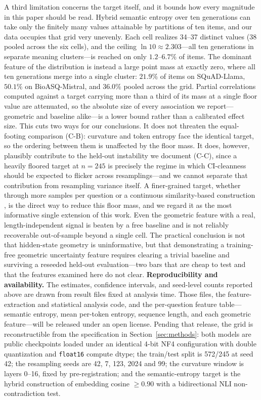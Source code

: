 \documentclass[11pt]{article}
\begin{document}
A third limitation concerns the target itself, and it bounds how every magnitude in this paper should be read. Hybrid semantic entropy over ten generations can take only the finitely many values attainable by partitions of ten items, and our data occupies that grid very unevenly. Each cell realizes 34--37 distinct values (38 pooled across the six cells), and the ceiling $\ln 10 \approx 2.303$---all ten generations in separate meaning clusters---is reached on only $1.2$--$6.7\%$ of items. The dominant feature of the distribution is instead a large point mass at exactly zero, where all ten generations merge into a single cluster: $21.9\%$ of items on SQuAD-Llama, $50.1\%$ on BioASQ-Mistral, and $36.0\%$ pooled across the grid. Partial correlations computed against a target carrying more than a third of its mass at a single floor value are attenuated, so the absolute size of every association we report---geometric and baseline alike---is a lower bound rather than a calibrated effect size. This cuts two ways for our conclusions. It does not threaten the equal-footing comparison (C-B): curvature and token entropy face the identical target, so the ordering between them is unaffected by the floor mass. It does, however, plausibly contribute to the held-out instability we document (C-C), since a heavily floored target at $n=245$ is precisely the regime in which CI-cleanness should be expected to flicker across resamplings---and we cannot separate that contribution from resampling variance itself. A finer-grained target, whether through more samples per question or a continuous similarity-based construction \citep{nguyen2025beyond,nikitin2024kernel}, is the direct way to reduce this floor mass, and we regard it as the most informative single extension of this work.
Even the geometric feature with a real, length-independent signal is beaten by a free baseline and is not reliably recoverable out-of-sample beyond a single cell. The practical conclusion is not that hidden-state geometry is uninformative, but that demonstrating a training-free geometric uncertainty feature requires clearing a trivial baseline and surviving a reseeded held-out evaluation---two bars that are cheap to test and that the features examined here do not clear.
\textbf{Reproducibility and availability.} The estimates, confidence intervals, and seed-level counts reported above are drawn from result files fixed at analysis time. Those files, the feature-extraction and statistical analysis code, and the per-question feature table---semantic entropy, mean per-token entropy, sequence length, and each geometric feature---will be released under an open license. Pending that release, the grid is reconstructible from the specification in Section~\ref{sec:methods}: both models are public checkpoints loaded under an identical 4-bit NF4 configuration with double quantization and \texttt{float16} compute dtype; the train/test split is 572/245 at seed 42; the resampling seeds are 42, 7, 123, 2024 and 99; the curvature window is layers 0--16, fixed by pre-registration; and the semantic-entropy target is the hybrid construction of embedding cosine $\geq 0.90$ with a bidirectional NLI non-contradiction test.


\end{document}
